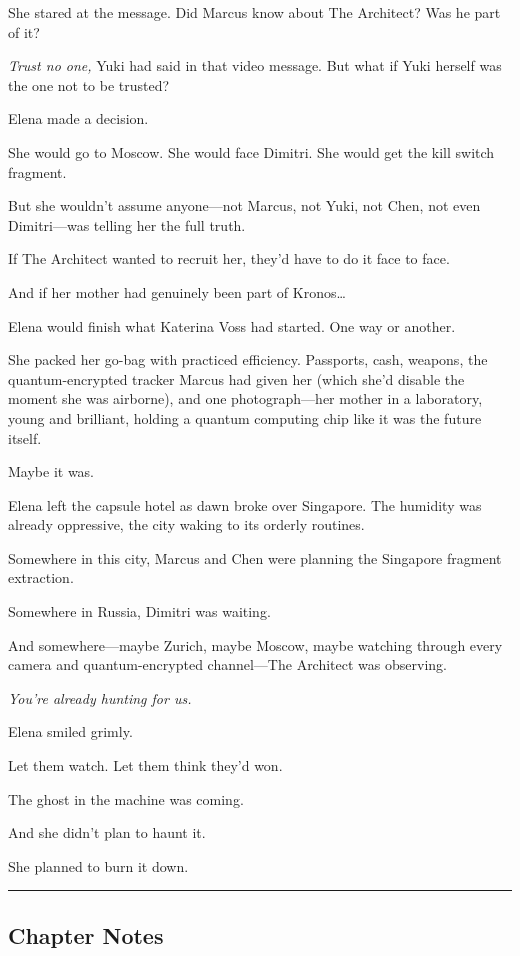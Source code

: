 She stared at the message. Did Marcus know about The Architect? Was he part of it?

\emph{Trust no one,} Yuki had said in that video message. But what if Yuki herself was the one not to be trusted?

Elena made a decision.

She would go to Moscow. She would face Dimitri. She would get the kill switch fragment.

But she wouldn't assume anyone---not Marcus, not Yuki, not Chen, not even Dimitri---was telling her the full truth.

If The Architect wanted to recruit her, they'd have to do it face to face.

And if her mother had genuinely been part of Kronos\ldots{}

Elena would finish what Katerina Voss had started. One way or another.

She packed her go-bag with practiced efficiency. Passports, cash, weapons, the quantum-encrypted tracker Marcus had given her (which she'd disable the moment she was airborne), and one photograph---her mother in a laboratory, young and brilliant, holding a quantum computing chip like it was the future itself.

Maybe it was.

Elena left the capsule hotel as dawn broke over Singapore. The humidity was already oppressive, the city waking to its orderly routines.

Somewhere in this city, Marcus and Chen were planning the Singapore fragment extraction.

Somewhere in Russia, Dimitri was waiting.

And somewhere---maybe Zurich, maybe Moscow, maybe watching through every camera and quantum-encrypted channel---The Architect was observing.

\emph{You're already hunting for us.}

Elena smiled grimly.

Let them watch. Let them think they'd won.

The ghost in the machine was coming.

And she didn't plan to haunt it.

She planned to burn it down.

\begin{center}\rule{0.5\linewidth}{0.5pt}\end{center}

\hypertarget{chapter-notes}{%
\subsection{Chapter Notes}\label{chapter-notes}}

